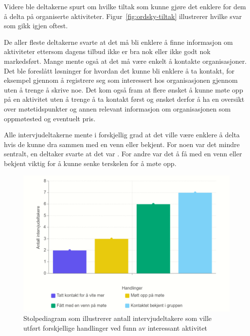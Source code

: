 Videre ble deltakerne spurt om hvilke tiltak som kunne gjøre det enklere for dem å delta på organiserte aktiviteter. Figur~\ref{fig:ordsky-tiltak} illustrerer hvilke svar som gikk igjen oftest.

De aller fleste deltakerne svarte at det må bli enklere å finne informasjon om aktiviteter ettersom dagens tilbud ikke er bra nok eller ikke godt nok markedsført. Mange mente også at det må være enkelt å kontakte organisasjoner. Det ble foreslått løsninger for hvordan det kunne bli enklere å ta kontakt, for eksempel gjennom å registrere seg som interessert hos organisasjonen gjennom uten å trenge å skrive noe. Det kom også fram at flere ønsket å kunne møte opp på en aktivitet uten å trenge å ta kontakt først og ønsket derfor å ha en oversikt over møtetidspunkter og annen relevant informasjon om organisasjonen som oppmøtested og eventuelt pris.

Alle intervjudeltakerne mente i forskjellig grad at det ville være enklere å delta hvis de kunne dra sammen med en venn eller bekjent. For noen var det mindre sentralt, en deltaker svarte at det var . For andre var det å få med en venn eller bekjent viktig for å kunne senke terskelen for å møte opp.

\begin{figure}[H]
\includegraphics[width=\textwidth]{Illustrasjoner/diagram-handlinger.png}
\caption{Stolpediagram som illustrerer antall intervjudeltakere som ville utført forskjellige handlinger ved funn av interessant aktivitet}
\label{fig:diagram-handlinger}
\end{figure}

